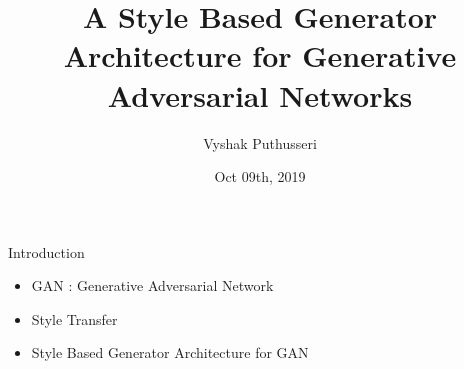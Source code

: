 \documentclass[10pt]{beamer}
\title{A Style Based Generator Architecture for Generative Adversarial Networks}
\date{Oct 09th, 2019}
\author{Vyshak Puthusseri}
\institute{MCA CET}
\begin{document}
\maketitle




{
\begin{frame}[fragile]{Introduction}

    \begin{itemize}
      \item GAN : Generative Adversarial Network
      \item Style Transfer
      \item Style Based Generator Architecture for GAN
    \end{itemize}

\end{frame}
}
\end{document}
